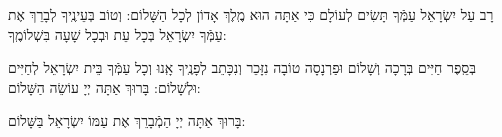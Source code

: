 \documentclass[twoside, openany, parskip=half, 11pt]{book}
\begin{document}
\retzeh

\yaalehveyavo

\zion

\maarivmodim

\alhanisim

\weekdaysahodos



 רָב עַל יִשְׂרָאֵל עַמְּֿךָ תָּשִׂים לְעוֹלָם כִּי אַתָּה הוּא מֶֽלֶךְ אָדוֹן לְכָל הַשָּׁלוֹם:
 וְטוֹב בְּעֵינֶֽיךָ לְבָרֵךְ אֶת עַמְּֿךָ יִשְׂרָאֵל בְּכָל עֵת וּבְכָל שָׁעָה בִּשְׁלוֹמֶֽךָ:
\vspace{-0.4\baselineskip}
\begin{paracol}{2}

\begin{small}
 בְּסֵֽפֶר חַיִּים בְּרָכָה וְשָׁלוֹם וּפַרְנָסָה טוֹבָה נִזָּכֵר וְנִכָּתֵב לְפָנֶֽיךָ אָֽנוּ וְכָל עַמְּֿךָ בֵּית יִשְׂרָאֵל לְחַיִּים וּלְשָׁלוֹם: בָּרוּךְ אַתָּה יְיָ עוֹשֵׂה הַשָּׁלוֹם:
\end{small}
\switchcolumn
בָּרוּךְ אַתָּה יְיָ הַמְֿבָרֵךְ אֶת עַמּוֹ יִשְׂרָאֵל בַּשָּׁלוֹם:
\end{paracol}

\tachanunim

\vfill



\end{document}
